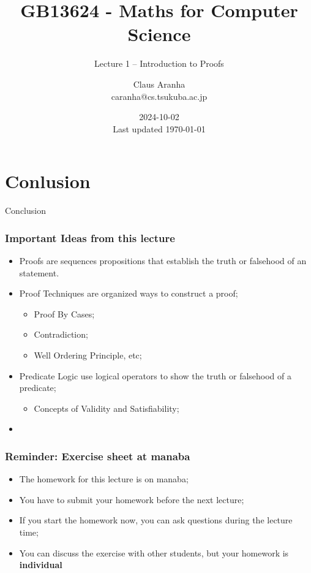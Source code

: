 \documentclass[aspectratio=169]{beamer}
\title[GB13624]{GB13624 - Maths for Computer Science}
\subtitle[]{Lecture 1 -- Introduction to Proofs}
\author[Claus Aranha]{Claus Aranha\\{\footnotesize caranha@cs.tsukuba.ac.jp}}
\institute[COINS]{College of Information Science}
\date[2024-10-02]{2024-10-02\\{\tiny Last updated \today}}
\begin{document}
\begin{frame}
  \maketitle
\end{frame}






\section{Conlusion}

\begin{frame}
  \begin{center}
    Conclusion
  \end{center}
\end{frame}

\begin{frame}
  \frametitle{Important Ideas from this lecture}
  \begin{itemize}
  \item Proofs are sequences propositions that establish the truth or falsehood of an statement.
  \item Proof Techniques are organized ways to construct a proof;
  \begin{itemize}
    \item Proof By Cases;
    \item Contradiction;
    \item Well Ordering Principle, etc;
  \end{itemize}
  \item Predicate Logic use logical operators to show the truth or falsehood of a predicate;
  \begin{itemize}
    \item Concepts of Validity and Satisfiability;
  \end{itemize}
  \item {}
  \end{itemize}
\end{frame}

\begin{frame}
  \frametitle{Reminder: Exercise sheet at manaba}

  \begin{itemize}
    \item The homework for this lecture is on manaba;
    \item You have to submit your homework before the next lecture;
    \item If you start the homework now, you can ask questions during the lecture time;
    \item You can discuss the exercise with other students, but your homework is {\bf individual}
  \end{itemize}
\end{frame}


\end{document}
